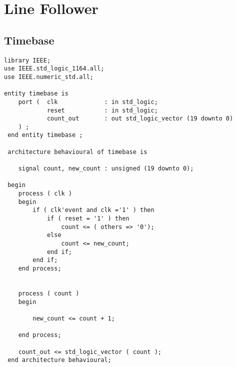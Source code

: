 \chapter{Line Follower} 
\label{appendix_linefollower}

\section{Timebase}
\begin{lstlisting}[style=vhdlStyle]
library IEEE;
use IEEE.std_logic_1164.all;
use IEEE.numeric_std.all;

entity timebase is
	port (  clk             : in std_logic;
        	reset           : in std_logic;
        	count_out       : out std_logic_vector (19 downto 0)
 	) ;
 end entity timebase ;

 architecture behavioural of timebase is

 	signal count, new_count : unsigned (19 downto 0);

 begin
 	process ( clk )
 	begin
 		if ( clk'event and clk ='1' ) then
			if ( reset = '1' ) then
 				count <= ( others => '0');
 			else
 				count <= new_count;
 			end if;
 		end if;
 	end process;


 	process ( count )
 	begin

		new_count <= count + 1;

 	end process;

 	count_out <= std_logic_vector ( count );
 end architecture behavioural;
 \end{lstlisting}

\newpage
